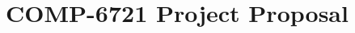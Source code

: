 \documentclass[10pt,twocolumn,letterpaper]{article}
\begin{document}
\title{COMP-6721 Project Proposal}

\maketitle



\end{document}
